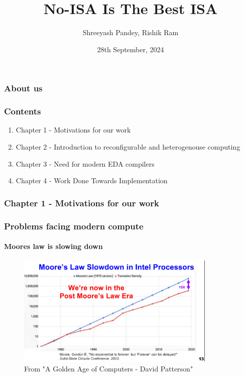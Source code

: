 \documentclass{beamer}
\title{No-ISA Is The Best ISA}
\subtitle{}
\author{Shreeyash Pandey, Rishik Ram}
\institute{Vicharak, India @ vicharak.in}
\date{28th September, 2024}
\begin{document}
\begin{frame}
\titlepage
\end{frame}

\begin{frame}[fragile]
\frametitle{About us}

\framesubtitle{}
\end{frame}

\begin{frame}[fragile]
\frametitle{Contents}

  \begin{enumerate}
    \item Chapter 1 - Motivations for our work
    \item Chapter 2 - Introduction to reconfigurable and heterogenouse computing
    \item Chapter 3 - Need for modern EDA compilers
    \item Chapter 4 - Work Done Towards Implementation  
  \end{enumerate}
\end{frame}

\begin{frame}[fragile]
\frametitle{Chapter 1 - Motivations for our work}

\end{frame}

\begin{frame}[fragile]
\frametitle{Problems facing modern compute}
\framesubtitle{Moores law is slowing down}

  \begin{figure}
    \centering
    \includegraphics[width=0.85\textwidth]{mooreslaw.png}
    \caption{From "A Golden Age of Computers - David Patterson"}
  \end{figure}

\end{frame}
\end{document}
